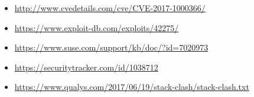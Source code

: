 \documentclass[a4paper,titlepage,openany,12pt]{article}
\begin{document}
\begin{itemize}
\item \url {http://www.cvedetails.com/cve/CVE-2017-1000366/}
\item \url{https://www.exploit-db.com/exploits/42275/}
\item \url{https://www.suse.com/support/kb/doc/?id=7020973}
\item \url{https://securitytracker.com/id/1038712}
\item \url{https://www.qualys.com/2017/06/19/stack-clash/stack-clash.txt}
\end{itemize}


\appendix

 
\end{document}
